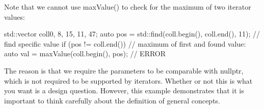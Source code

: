 Note that we cannot use maxValue() to check for the maximum of two iterator values:

\begin{cpp}
std::vector coll{0, 8, 15, 11, 47};
auto pos = std::find(coll.begin(), coll.end(), 11); // find specific value
if (pos != coll.end()) {
	// maximum of first and found value:
	auto val = maxValue(coll.begin(), pos); // ERROR
}
\end{cpp}

The reason is that we require the parameters to be comparable with nullptr, which is not required to be supported by iterators. Whether or not this is what you want is a design question. However, this example demonstrates that it is important to think carefully about the definition of general concepts.







